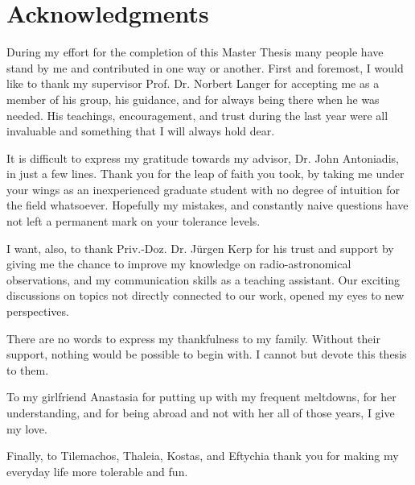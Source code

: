 \documentclass[../main/thesis_msc.tex]{subfiles}
\begin{document}
\chapter*{Acknowledgments}

During my effort for the completion of this Master Thesis many people have stand by me and contributed in one way or another. First and foremost, I would like to thank my supervisor Prof. Dr. Norbert Langer for accepting me as a member of his group, his guidance, and for always being there when he was needed. His teachings, encouragement, and trust during the last year were all invaluable and something that I will always hold dear.


It is difficult to express my gratitude towards my advisor, Dr. John Antoniadis, in just a few lines. Thank you for the leap of faith you took, by taking me under your wings as an inexperienced graduate student with no degree of intuition for the field whatsoever. Hopefully my mistakes, and constantly naive questions have not left a permanent mark on your tolerance levels.


I want, also, to thank Priv.-Doz. Dr. J\"urgen Kerp for his trust and support by giving me the chance to improve my knowledge on radio-astronomical observations, and my communication skills as a teaching assistant. Our exciting discussions on topics not directly connected to our work, opened my eyes to new perspectives. 


There are no words to express my thankfulness to my family. Without their support, nothing would be possible to begin with. I cannot but devote this thesis to them.


To my girlfriend Anastasia for putting up with my frequent meltdowns, for her understanding, and for being abroad and not with her all of those years, I give my love.


Finally, to Tilemachos, Thaleia, Kostas, and Eftychia thank you for making my everyday life more tolerable and fun.
\end{document}
